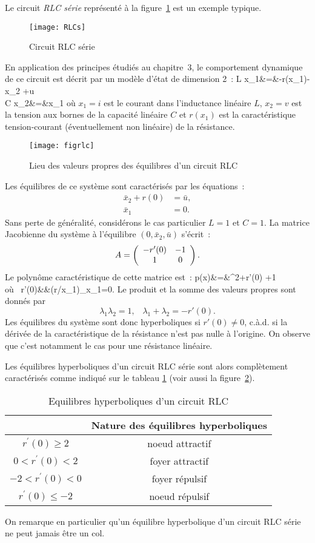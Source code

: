 Le circuit {\em RLC s{é}rie} repr{é}sent{é} {à} la figure~\ref{fig:RLCs}
est un exemple typique.
\begin{figure}[htbp] 
   \centering
   \texttt{[image: RLCs]} 
   \caption{Circuit RLC s{é}rie}
   \label{fig:RLCs}
\end{figure}
En application des principes {é}tudi{é}s au chapitre~3, le 
comportement dynamique de ce circuit est d{é}crit par un mod{è}le 
d'{é}tat de dimension 2~:
\eqnn
L \dot x_1&=&-r(x_1)-x_2 +u\\
C \dot x_2&=&x_1
\eeqnn
o{ù} $x_1=i$ est le courant dans l'inductance linéaire $L$, $x_2=v$ est 
la tension aux bornes de la capacit{é} linéaire $C$ et $r(x_1)$ est la 
caract{é}ristique tension-courant ({é}ventuellement non lin{é}aire)
de la r{é}sistance.
\begin{figure}[t] 
   \centering
   \texttt{[image: figrlc]} 
   \caption{Lieu des valeurs propres des {é}quilibres d'un circuit RLC}
   \label{fig:figrlc}
\end{figure}

Les {é}quilibres de ce syst{è}me sont caract{é}ris{é}s par 
les {é}quations~:
\begin{align*}
\bar x_2 +r(0) &= \bar u,\\
\bar x_1 &= 0.
\end{align*}
Sans perte de généralité, considérons le cas particulier $L=1$ et $C=1$. La matrice Jacobienne du syst{è}me {à} l'{é}quilibre $(0,\bar x_2,\bar u)$ s'{é}crit~:
$$A=\bma{cc} -r'(0) & -1\\1&0\ema .$$
Le polyn{\^o}me caract{é}ristique de cette matrice est~:
\eqnn
p(x)&=&\lambda^2+r'(0) \lambda +1\\
\mbox{o{ù} }\;\; r'(0)&\triangleq&(\partial r/\partial x_1)_{x_1=0}.
\eeqnn
Le produit et la somme des valeurs propres sont donn{é}s par
$$ \lambda_1\lambda_2=1,  \;\;\; \lambda_1+\lambda_2=-r'(0).$$
Les {é}quilibres du syst{è}me sont donc hyperboliques si $r'(0)\neq 0$, 
c.{à}.d. si la d{é}riv{é}e de la caract{é}ristique de la r{é}sistance n'est pas 
nulle {à} l'origine. On observe que c'est notamment le cas pour une 
r{é}sistance lin{é}aire.

Les {é}quilibres hyperboliques d'un circuit RLC s{é}rie sont alors compl{è}tement
caract{é}ris{é}s comme indiqu{é} sur le tableau \ref{tabrlc} 
(voir aussi la figure~\ref{fig:figrlc}).
\begin{table}
\centering
\renewcommand{\arraystretch}{3.0}
\begin{tabular}{|c|c|}
\hline
&Nature des {é}quilibres hyperboliques\\ \hline
$r^{'}(0) \geq 2$&noeud attractif \\ \hline
$0 < r^{'}(0) < 2$&foyer attractif \\ \hline
$-2 < r^{'}(0) < 0$&foyer répulsif \\ \hline
$r^{'}(0) \leq -2 $& noeud répulsif\\
\hline
\end{tabular}
\caption{Equilibres hyperboliques d'un circuit RLC}\label{tabrlc}
\end{table}
On remarque en particulier qu'un {é}quilibre hyperbolique d'un circuit RLC s{é}rie ne peut jamais {ê}tre un col.

